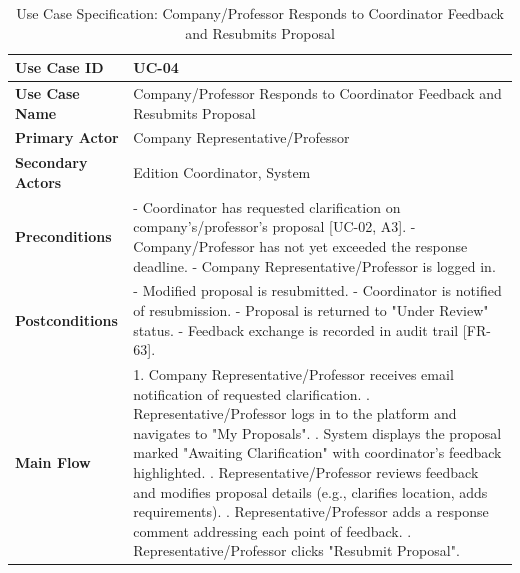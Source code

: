 \newpage
\renewcommand{\arraystretch}{1.5} 
\begin{xltabular}{\textwidth}{|l|X|}
    \caption{Use Case Specification: Company/Professor Responds to Coordinator Feedback and Resubmits Proposal} \label{tab:UC-04} \\
    
    \hline
    \textbf{Use Case ID} & UC-04 \\ \hline
    \textbf{Use Case Name} & Company/Professor Responds to Coordinator Feedback and Resubmits Proposal \\ \hline
    \textbf{Primary Actor} & Company Representative/Professor \\ \hline
    \textbf{Secondary Actors} & Edition Coordinator, System \\ \hline
    \textbf{Preconditions} &
        - Coordinator has requested clarification on company's/professor's proposal [UC-02, A3]. \newline
        - Company/Professor has not yet exceeded the response deadline. \newline
        - Company Representative/Professor is logged in.
        \\ \hline
    \textbf{Postconditions} &
        - Modified proposal is resubmitted. \newline
        - Coordinator is notified of resubmission. \newline
        - Proposal is returned to "Under Review" status. \newline
        - Feedback exchange is recorded in audit trail [FR-63].
        \\ \hline
    \textbf{Main Flow} &
        1. Company Representative/Professor receives email notification of requested clarification. . Representative/Professor logs in to the platform and navigates to "My Proposals". . System displays the proposal marked "Awaiting Clarification" with coordinator's feedback highlighted. . Representative/Professor reviews feedback and modifies proposal details (e.g., clarifies location, adds requirements). . Representative/Professor adds a response comment addressing each point of feedback. . Representative/Professor clicks "Resubmit Proposal". \newline

\end{xltabular}
